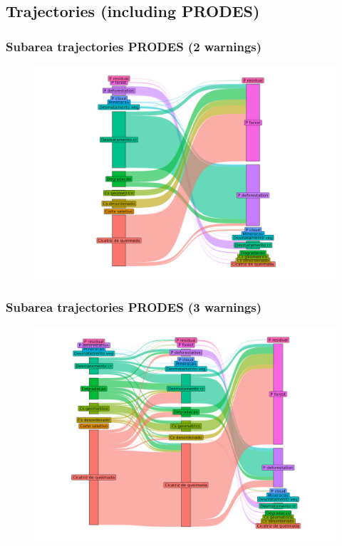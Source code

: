 \documentclass[aspectratio=169]{beamer}
\begin{document}
\subsection{Trajectories (including PRODES)}

\begin{frame}
    \frametitle{Subarea trajectories PRODES (2 warnings)}
    \begin{figure}[h]
        \includegraphics[width=0.75\linewidth]
        {./figures/plot_deter_prodes_subarea_trajectory_2.png}
    \end{figure}
\end{frame}

\begin{frame}
    \frametitle{Subarea trajectories PRODES (3 warnings)}
    \begin{figure}[h]
        \includegraphics[width=0.75\linewidth]
        {./figures/plot_deter_prodes_subarea_trajectory_3.png}
    \end{figure}
\end{frame}
\end{document}
